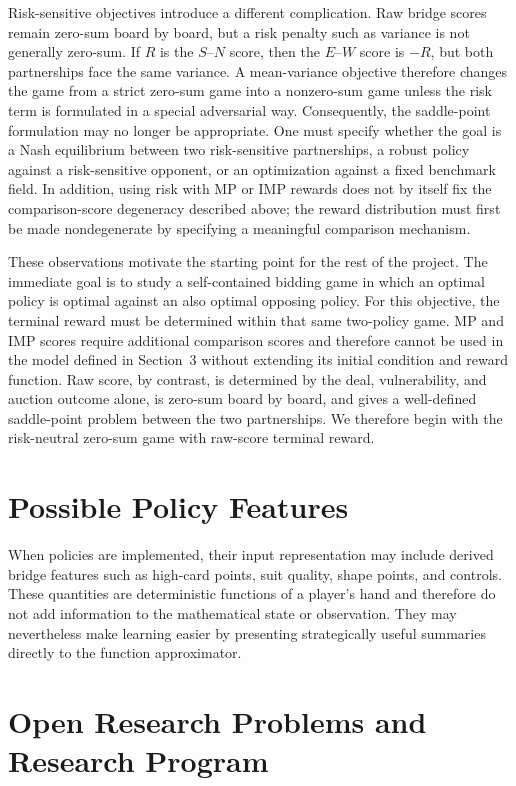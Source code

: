 \documentclass[11pt]{article}
\begin{document}
Risk-sensitive objectives introduce a different complication. Raw bridge scores remain zero-sum board by board, but a risk penalty such as variance is not generally zero-sum. If $R$ is the $S$--$N$ score, then the $E$--$W$ score is $-R$, but both partnerships face the same variance. A mean-variance objective therefore changes the game from a strict zero-sum game into a nonzero-sum game unless the risk term is formulated in a special adversarial way. Consequently, the saddle-point formulation may no longer be appropriate. One must specify whether the goal is a Nash equilibrium between two risk-sensitive partnerships, a robust policy against a risk-sensitive opponent, or an optimization against a fixed benchmark field. In addition, using risk with MP or IMP rewards does not by itself fix the comparison-score degeneracy described above; the reward distribution must first be made nondegenerate by specifying a meaningful comparison mechanism.

These observations motivate the starting point for the rest of the project. The immediate goal is to study a self-contained bidding game in which an optimal policy is optimal against an also optimal opposing policy. For this objective, the terminal reward must be determined within that same two-policy game. MP and IMP scores require additional comparison scores and therefore cannot be used in the model defined in Section~3 without extending its initial condition and reward function. Raw score, by contrast, is determined by the deal, vulnerability, and auction outcome alone, is zero-sum board by board, and gives a well-defined saddle-point problem between the two partnerships. We therefore begin with the risk-neutral zero-sum game with raw-score terminal reward.

\section{Possible Policy Features}

When policies are implemented, their input representation may include derived bridge features such as high-card points, suit quality, shape points, and controls. These quantities are deterministic functions of a player's hand and therefore do not add information to the mathematical state or observation. They may nevertheless make learning easier by presenting strategically useful summaries directly to the function approximator.

\section{Open Research Problems and Research Program}
\end{document}
